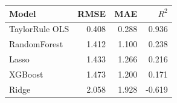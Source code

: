 \begin{tabular}{lrrr}
\toprule
Model & RMSE & MAE & $R^2$ \\
\midrule
TaylorRule OLS & 0.408 & 0.288 & 0.936 \\
RandomForest & 1.412 & 1.100 & 0.238 \\
Lasso & 1.433 & 1.266 & 0.216 \\
XGBoost & 1.473 & 1.200 & 0.171 \\
Ridge & 2.058 & 1.928 & -0.619 \\
\bottomrule
\end{tabular}

